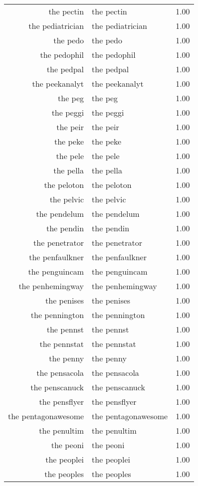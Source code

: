 \begin{table}[ht]
\begin{tabular}{rlr}
  the pectin & the pectin & 1.00 \\ 
  the pediatrician & the pediatrician & 1.00 \\ 
  the pedo & the pedo & 1.00 \\ 
  the pedophil & the pedophil & 1.00 \\ 
  the pedpal & the pedpal & 1.00 \\ 
  the peekanalyt & the peekanalyt & 1.00 \\ 
  the peg & the peg & 1.00 \\ 
  the peggi & the peggi & 1.00 \\ 
  the peir & the peir & 1.00 \\ 
  the peke & the peke & 1.00 \\ 
  the pele & the pele & 1.00 \\ 
  the pella & the pella & 1.00 \\ 
  the peloton & the peloton & 1.00 \\ 
  the pelvic & the pelvic & 1.00 \\ 
  the pendelum & the pendelum & 1.00 \\ 
  the pendin & the pendin & 1.00 \\ 
  the penetrator & the penetrator & 1.00 \\ 
  the penfaulkner & the penfaulkner & 1.00 \\ 
  the penguincam & the penguincam & 1.00 \\ 
  the penhemingway & the penhemingway & 1.00 \\ 
  the penises & the penises & 1.00 \\ 
  the pennington & the pennington & 1.00 \\ 
  the pennst & the pennst & 1.00 \\ 
  the pennstat & the pennstat & 1.00 \\ 
  the penny & the penny & 1.00 \\ 
  the pensacola & the pensacola & 1.00 \\ 
  the penscanuck & the penscanuck & 1.00 \\ 
  the pensflyer & the pensflyer & 1.00 \\ 
  the pentagonawesome & the pentagonawesome & 1.00 \\ 
  the penultim & the penultim & 1.00 \\ 
  the peoni & the peoni & 1.00 \\ 
  the peoplei & the peoplei & 1.00 \\ 
  the peoples & the peoples & 1.00 \\ 

\end{tabular}
\end{table}
